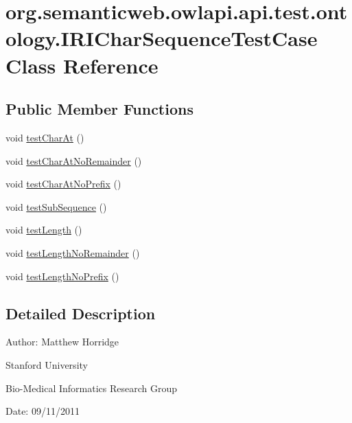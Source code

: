 \hypertarget{classorg_1_1semanticweb_1_1owlapi_1_1api_1_1test_1_1ontology_1_1_i_r_i_char_sequence_test_case}{\section{org.\-semanticweb.\-owlapi.\-api.\-test.\-ontology.\-I\-R\-I\-Char\-Sequence\-Test\-Case Class Reference}
\label{classorg_1_1semanticweb_1_1owlapi_1_1api_1_1test_1_1ontology_1_1_i_r_i_char_sequence_test_case}
}
\subsection*{Public Member Functions}
\begin{DoxyCompactItemize}
\item 
void \hyperlink{classorg_1_1semanticweb_1_1owlapi_1_1api_1_1test_1_1ontology_1_1_i_r_i_char_sequence_test_case_a51b70bd2e526b72da30cf80c8013c326}{test\-Char\-At} ()
\item 
void \hyperlink{classorg_1_1semanticweb_1_1owlapi_1_1api_1_1test_1_1ontology_1_1_i_r_i_char_sequence_test_case_ab7668878605f61edf6a8bebd10352fba}{test\-Char\-At\-No\-Remainder} ()
\item 
void \hyperlink{classorg_1_1semanticweb_1_1owlapi_1_1api_1_1test_1_1ontology_1_1_i_r_i_char_sequence_test_case_a79154bfd59dbd8715d3dad5b93b792f1}{test\-Char\-At\-No\-Prefix} ()
\item 
void \hyperlink{classorg_1_1semanticweb_1_1owlapi_1_1api_1_1test_1_1ontology_1_1_i_r_i_char_sequence_test_case_a05698c9d1a5d926ee685d8497da5d6b9}{test\-Sub\-Sequence} ()
\item 
void \hyperlink{classorg_1_1semanticweb_1_1owlapi_1_1api_1_1test_1_1ontology_1_1_i_r_i_char_sequence_test_case_a8331fa4551808ff65a1edf43d3239512}{test\-Length} ()
\item 
void \hyperlink{classorg_1_1semanticweb_1_1owlapi_1_1api_1_1test_1_1ontology_1_1_i_r_i_char_sequence_test_case_ae941d3c9acbca7378c5b168f75436d42}{test\-Length\-No\-Remainder} ()
\item 
void \hyperlink{classorg_1_1semanticweb_1_1owlapi_1_1api_1_1test_1_1ontology_1_1_i_r_i_char_sequence_test_case_ac1d07f8043367dc84be68a0b011bf0fc}{test\-Length\-No\-Prefix} ()
\end{DoxyCompactItemize}


\subsection{Detailed Description}
Author\-: Matthew Horridge\par
 Stanford University\par
 Bio-\/\-Medical Informatics Research Group\par
 Date\-: 09/11/2011 

